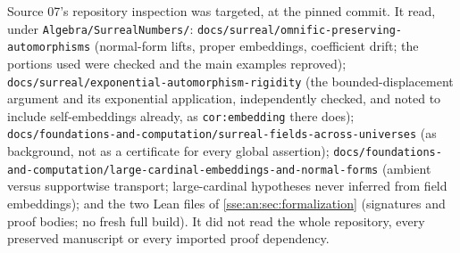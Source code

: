 \documentclass[11pt,a4paper]{article}
\numberwithin{equation}{section}
\theoremstyle{plain}
\theoremstyle{definition}
\theoremstyle{remark}
\newcommand{\lbl}[1]{\nolinkurl{#1}}%
\newcommand{\fn}[1]{\nolinkurl{#1}}%
\begin{document}
Source 07's repository inspection was targeted, at the pinned commit. It read,
under \fn{Algebra/SurrealNumbers/}: \fn{docs/surreal/omnific-preserving-automorphisms}
(normal-form lifts, proper embeddings, coefficient drift; the portions used
were checked and the main examples reproved);
\fn{docs/surreal/exponential-automorphism-rigidity} (the bounded-displacement
argument and its exponential application, independently checked, and noted to
include self-embeddings already, as \lbl{cor:embedding} there does);
\fn{docs/foundations-and-computation/surreal-fields-across-universes} (as
background, not as a certificate for every global assertion);
\fn{docs/foundations-and-computation/large-cardinal-embeddings-and-normal-forms}
(ambient versus supportwise transport; large-cardinal hypotheses never
inferred from field embeddings); and the two Lean files of
\cref{sse:an:sec:formalization} (signatures and proof bodies; no fresh full
build). It did not read the whole repository, every preserved manuscript or
every imported proof dependency.
\end{document}
